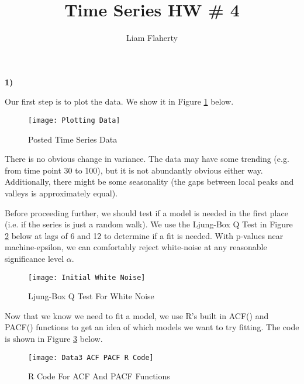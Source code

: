 \documentclass[12pt, letterpaper]{article}
\title{Time Series HW \# 4}
\author{Liam Flaherty}
\date{\parbox{\linewidth}{\centering%
		Professor Martin\endgraf\bigskip
		NCSU: ST534-001\endgraf\bigskip
		October 7, 2024 \endgraf}}
\theoremstyle{definition}
\numberwithin{equation}{section}
\newcommand{\+}[1]{+_{\scalebox{.375}{#1}}}
\newcommand{\1}{\mathbbm{1}}
\begin{document}
\maketitle
\thispagestyle{empty}

\newpage\clearpage\noindent


\noindent\textbf{1) }

\vspace{\baselineskip}
\noindent\textbf{}
\vspace{\baselineskip}

Our first step is to plot the data. We show it in Figure \ref{Time Series Data} below. 

\begin{figure}[H]
	\centering
	\texttt{[image: Plotting Data]}
	\caption{Posted Time Series Data}
	\label{Time Series Data}
\end{figure}

There is no obvious change in variance. The data may have some trending (e.g. from time point 30 to 100), but it is not abundantly obvious either way. Additionally, there might be some seasonality (the gaps between local peaks and valleys is approximately equal).
\vspace{\baselineskip}

Before proceeding further, we should test if a model is needed in the first place (i.e. if the series is just a random walk). We use the Ljung-Box Q Test in Figure \ref{Initial White Noise} below at lags of 6 and 12 to determine if a fit is needed. With p-values near machine-epsilon, we can comfortably reject white-noise at any reasonable significance level $\alpha$.

\begin{figure}[H]
	\centering
	\texttt{[image: Initial White Noise]}
	\caption{Ljung-Box Q Test For White Noise}
	\label{Initial White Noise}
\end{figure}

Now that we know we need to fit a model, we use R's built in ACF() and PACF() functions to get an idea of which models we want to try fitting. The code is shown in Figure \ref{Data3 ACF PACF R Code} below.

\begin{figure}[H]
	\centering
	\texttt{[image: Data3 ACF PACF R Code]}
	\caption{R Code For ACF And PACF Functions}
	\label{Data3 ACF PACF R Code}
\end{figure}
\end{document}
